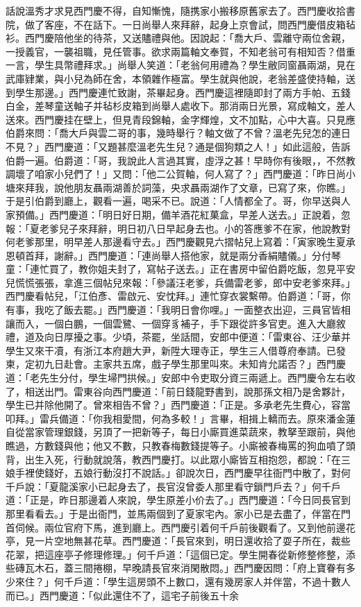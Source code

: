 \begin{showcontents}{}
話說溫秀才求見西門慶不得，自知慚愧，隨携家小搬移原舊家去了。西門慶收拾書院，做了客座，不在話下。一日尚舉人來拜辭，起身上京會試，問西門慶借皮箱毡衫。西門慶陪他坐的待茶，又送贐禮與他。因說起：「喬大戶、雲離守兩位舍親，一授義官，一襲祖職，見任管事。欲求兩篇軸文奉賀，不知老翁可有相知否？借重一言，學生具幣禮拜求。」尚舉人笑道：「老翁何用禮為？學生敝同窗聶兩湖，見在武庫肄業，與小兒為師在舍，本領雜作極富。學生就與他說，老翁差盛使持軸，送到學生那邊。」西門慶連忙致謝，茶畢起身。西門慶這裡隨即封了兩方手帕、五錢白金，差琴童送軸子并毡杉皮箱到尚舉人處收下。那消兩日光景，寫成軸文，差人送來。西門慶挂在壁上，但見青段錦軸，金字輝煌，文不加點，心中大喜。只見應伯爵來問：「喬大戶與雲二哥的事，幾時舉行？軸文做了不曾？溫老先兒怎的連日不見？」西門慶道：「又題甚麼溫老先生兒？通是個狗類之人！」如此這般，告訴伯爵一遍。伯爵道：「哥，我說此人言過其實，虛浮之甚！早時你有後眼，，不然教調壞了咱家小兒們了！」又問：「他二公賀軸，何人寫了？」西門慶道：「昨日尚小塘來拜我，說他朋友聶兩湖善於詞藻，央求聶兩湖作了文章，已寫了來，你瞧。」于是引伯爵到廳上，觀看一遍，喝采不已。說道：「人情都全了。哥，你早送與人家預備。」西門慶道：「明日好日期，備羊酒花紅菓盒，早差人送去。」正說着，忽報：「夏老爹兒子來拜辭，明日初八日早起身去也。小的答應爹不在家，他說教對何老爹那里，明早差人那邊看守去。」西門慶觀見六摺帖兒上寫着：「寅家晚生夏承恩頓首拜，謝辭。」西門慶道：「連尚舉人搭他家，就是兩分香絹贐儀。」分付琴童：「連忙買了，教你姐夫封了，寫帖子送去。」正在書房中留伯爵吃飯，忽見平安兒慌慌張張，拿進三個帖兒來報：「參議汪老爹，兵備雷老爹，郎中安老爹來拜。」西門慶看帖兒，「江伯彥、雷啟元、安忱拜。」連忙穿衣裳繫帶。伯爵道：「哥，你有事，我吃了飯去罷。」西門慶道：「我明日會你哩。」一面整衣出迎，三員官皆相讓而入，一個白鵬，一個雲鷺、一個穿豸補子，手下跟從許多官吏。進入大廳敘禮，道及向日厚擾之事。少頃，茶罷，坐話間，安郎中便道：「雷東谷、汪少華并學生又來干凟，有浙江本府趙大尹，新陞大理寺正，學生三人借尊府奉請。已發柬，定初九日赴會。主家共五席，戲子學生那里叫來。未知肯允諾否？」西門慶道：「老先生分付，學生埽門拱候。」安郎中令吏取分資三兩遞上。西門慶令左右收了，相送出門。雷東谷向西門慶道：「前日錢龍野書到，說那孫文相乃是舍夥計，學生已并除他開了。曾來相告不曾？」西門慶道：「正是。多承老先生費心，容當叩拜。」雷兵備道：「你我相愛間，何為多較！」言畢，相揖上轎而去。原來潘金蓮自從當家管理銀錢，另頂了一把新等子，每日小廝買進菜蔬來，教拏至跟前，與他瞧過，方數錢與他；他又不數，只教春梅數錢提等子。小廝被春梅罵的狗血噴了頭背，出生入死，行動就說落，教西門慶打。以此眾小廝皆互相抱怨，都說：「在三娘手裡使錢好，五娘行動沒打不說話。」卻說次日，西門慶早往衙門中散了，對何千戶說：「夏龍溪家小已起身去了，長官沒曾委人那里看守鎖門戶去？」何千戶道：「正是，昨日那邊着人來說，學生原差小价去了。」西門慶道：「今日同長官到那里看看去。」于是出衙門，並馬兩個到了夏家宅內。家小已是去盡了，伴當在門首伺候。兩位官府下馬，進到廳上。西門慶引着何千戶前後觀看了。又到他前邊花亭，見一片空地無甚花草。西門慶道：「長官來到，明日還收拾了耍子所在，裁些花翠，把這座亭子修理修理。」何千戶道：「這個已定。學生開春從新修整修整，添些磚瓦木石，蓋三間捲棚，早晚請長官來消閑散悶。」西門慶因問：「府上寶眷有多少來住？」何千戶道：「學生這房頭不上數口，還有幾房家人并伴當，不過十數人而已。」西門慶道：「似此還住不了，這宅子前後五十余
\end{showcontents}
